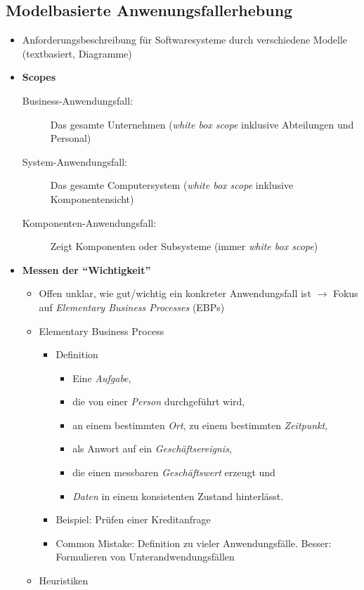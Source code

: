\subsection{Modelbasierte Anwenungsfallerhebung}
\begin{itemize}
	\item Anforderungsbeschreibung für Softwaresysteme durch verschiedene Modelle (textbasiert, Diagramme)
	\item \textbf{Scopes}
	\begin{description}
		\item[Business-Anwendungsfall:] Das gesamte Unternehmen (\textit{white box scope} inklusive Abteilungen und Personal)
		\item[System-Anwendungsfall:] Das gesamte Computersystem (\textit{white box scope} inklusive Komponentensicht)
		\item[Komponenten-Anwendungsfall:] Zeigt Komponenten oder Subsysteme (immer \textit{white box scope})
	\end{description}
	\item \textbf{Messen der "`Wichtigkeit"'}
	\begin{itemize}
		\item Offen unklar, wie gut/wichtig ein konkreter Anwendungsfall ist \(\rightarrow\) Fokus auf \textit{Elementary Business Processes} (EBPs)
		\item Elementary Business Process
		\begin{itemize}
			\item Definition
			\begin{itemize}
				\item Eine \textit{Aufgabe},
				\item die von einer \textit{Person} durchgeführt wird,
				\item an einem bestimmten \textit{Ort}, zu einem bestimmten \textit{Zeitpunkt},
				\item als Anwort auf ein \textit{Geschäftsereignis},
				\item die einen messbaren \textit{Geschäftswert} erzeugt und
				\item \textit{Daten} in einem konsistenten Zustand hinterlässt.
			\end{itemize}
			\item Beispiel: Prüfen einer Kreditanfrage
			\item Common Mistake: Definition zu vieler Anwendungsfälle. Besser: Formulieren von Unterandwendungsfällen
		\end{itemize}
		\item Heuristiken

\end{itemize}
\end{itemize}

